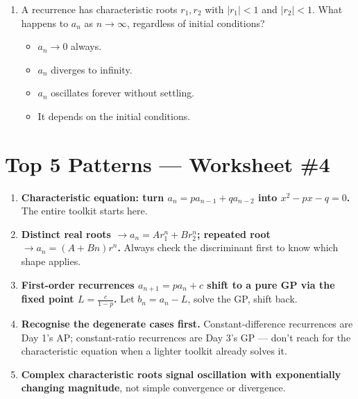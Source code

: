 \documentclass[11pt,a4paper]{article}
\begin{document}
\begin{enumerate}
\item A recurrence has characteristic roots $r_1,r_2$ with $|r_1|<1$ and $|r_2|<1$. What happens to $a_n$ as $n\to\infty$, regardless of initial conditions?
\begin{itemize}
\item[A)] $a_n\to0$ always.
\item[B)] $a_n$ diverges to infinity.
\item[C)] $a_n$ oscillates forever without settling.
\item[D)] It depends on the initial conditions.
\end{itemize}


\end{enumerate}

\section*{Top 5 Patterns --- Worksheet \#4}
\begin{enumerate}[leftmargin=2em,itemsep=4pt]
  \item \textbf{Characteristic equation: turn $a_n=pa_{n-1}+qa_{n-2}$ into $x^2-px-q=0$.} The entire toolkit starts here. 
  \item \textbf{Distinct real roots $\to a_n=Ar_1^n+Br_2^n$; repeated root $\to a_n=(A+Bn)r^n$.} Always check the discriminant first to know which shape applies. 
  \item \textbf{First-order recurrences $a_{n+1}=pa_n+c$ shift to a pure GP via the fixed point $L=\frac c{1-p}$.} Let $b_n=a_n-L$, solve the GP, shift back. 
  \item \textbf{Recognise the degenerate cases first.} Constant-difference recurrences are Day 1's AP; constant-ratio recurrences are Day 3's GP --- don't reach for the characteristic equation when a lighter toolkit already solves it. 
  \item \textbf{Complex characteristic roots signal oscillation with exponentially changing magnitude}, not simple convergence or divergence. 
\end{enumerate}
\end{document}
